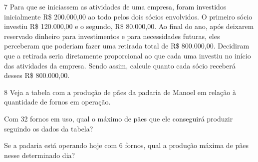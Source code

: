 
\num{7} Para que se iniciassem as atividades de uma empresa, foram investidos
inicialmente R\$ 200.000,00 ao todo pelos dois sócios envolvidos. O primeiro
sócio investiu R\$ 120.000,00 e o segundo, R\$ 80.000,00. Ao final do ano,
após deixarem reservado dinheiro para investimentos e para necessidades
futuras, eles perceberam que poderiam fazer uma retirada total de R\$ 800.000,00. Decidiram que a retirada seria diretamente proporcional ao que
cada uma investiu no início das atividades da empresa. Sendo assim,
calcule quanto cada sócio receberá desses R\$ 800.000,00.



\num{8} Veja a tabela com a produção de pães da padaria de Manoel em relação à quantidade de fornos em operação.


\begin{escolha}
\item
  Com 32 fornos em uso, qual o máximo de pães que ele conseguirá
  produzir seguindo os dados da tabela?


\item
  Se a padaria está operando hoje com 6 fornos, qual a produção máxima
  de pães nesse determinado dia?

\end{escolha}

